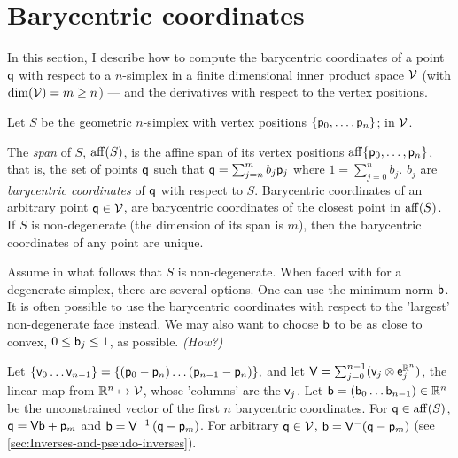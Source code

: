 
\section{Barycentric coordinates}
\label{sec:barycentric-coordinates}

In this section, I describe how to compute
the barycentric coordinates of a point $\mathsf{q}$
with respect to a $n$-simplex in
a finite dimensional inner product space $\mathcal{V}$
(with $\mathrm{dim} (\mathcal{V} ) = m \ge n$) ---
and the derivatives with respect to the vertex positions.

Let $S$ be the geometric $n$-simplex
with vertex positions $\{\mathsf{p}_0 , \ldots , \mathsf{p}_n\}$;
in $\mathcal{V}$.

The {\it span} of $S$, $\mathrm{aff} ( S )$,
is the affine span of its vertex positions
$\mathrm{aff} \{\mathsf{p}_0 , \ldots , \mathsf{p}_n\}$,
that is, the set of points $\mathsf{q}$ such that
$\mathsf{q} = \sum_{j=n}^{m} b_j \mathsf{p}_j $ where $1 = \sum_{j=0}^{n} b_j $.
$b_j$ are {\it barycentric coordinates} of $\mathsf{q}$ with respect to $S$.
Barycentric coordinates of an arbitrary point $\mathsf{q} \in \mathcal{V}$,
are barycentric coordinates of the closest point in $\mathrm{aff}(S)$.
If $S$ is non-degenerate (the dimension of its span is $m$),
then the barycentric coordinates of any point are unique.

Assume in what follows that $S$ is non-degenerate.
When faced with for a degenerate simplex, there are several options.
One can use the minimum norm $\mathsf{b}$.
It is often possible to use the barycentric coordinates
with respect to the 'largest' non-degenerate face instead.
We may also want to choose $\mathsf{b}$ to be as close to convex,
$0 \le \mathsf{b}_j \le 1$, as possible. {\it (How?)}

Let $\{ \mathsf{v}_0 \ldots \mathsf{v}_{n-1} \} = \{ (\mathsf{p}_0 - \mathsf{p}_n) \ldots (\mathsf{p}_{n-1} - \mathsf{p}_n)\},$
and let $\mathsf{V} = \sum_{j=0}^{n-1} ( \mathsf{v}_j \otimes \mathsf{e}_j^{\mathbb{R}^n} )$,
the linear map from $\mathbb{R}^n \mapsto \mathcal{V}$,
whose 'columns' are the $\mathsf{v}_j$.
Let $\mathsf{b} = \left( \mathsf{b}_0 \ldots \mathsf{b}_{n-1} \right) \in \mathbb{R}^n$
be the unconstrained vector of the first $n$ barycentric coordinates.
For $\mathsf{q} \in \mathrm{aff} ( S )$, $\mathsf{q} = \mathsf{V} \mathsf{b} + \mathsf{p}_m$
and $\mathsf{b} = \mathsf{V}^{-1} \left ( \mathsf{q} - \mathsf{p}_m \right)$.
For arbitrary $\mathsf{q} \in \mathcal{V}$,
$\mathsf{b} = \mathsf{V}^{-} (\mathsf{q} - \mathsf{p}_m)$
(see \autoref{sec:Inverses-and-pseudo-inverses}).













